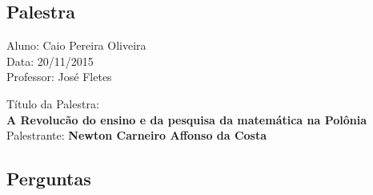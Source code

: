 \documentclass{article}
\begin{document}
\begin{center}
\section*{Palestra}
\begin{center}
Aluno: Caio Pereira Oliveira
\\Data: 20/11/2015
\\Professor: José Fletes
\end{center}

\begin{center}
Título da Palestra: \\ {\bf A Revolucão do ensino e da pesquisa da matemática na Polônia}
Palestrante: {\bf Newton Carneiro Affonso da Costa}
\end{center}

\subsection*{Perguntas}

\end{center}
\end{document}
